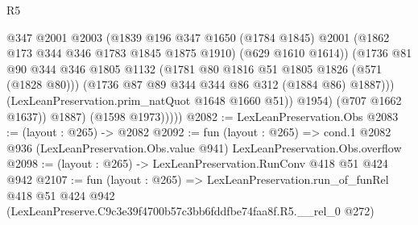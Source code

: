 \begin{lexlean}{R5}
\begin{coremodule}
                      @347
                      @2001
                      @2003
                      (@1839
                        @196
                        @347
                        @1650
                        (@1784 @1845)
                        @2001
                        (@1862 @173 @344 @346 @1783 @1845 @1875 @1910)
                        (@629 @1610 @1614))
                      (@1736
                        @81
                        @90
                        @344
                        @346
                        @1805
                        @1132
                        (@1781 @80 @1816 @51 @1805 @1826 (@571 (@1828 @80)))
                        (@1736 @87 @89 @344 @344 @86 @312 (@1884 @86) @1887)))
                    (LexLeanPreservation.prim_natQuot @1648 @1660 @51))
                  @1954)
                (@707 @1662 @1637))
              @1887)
            (@1598 @1973)))))
@2082 := LexLeanPreservation.Obs
@2083 := (layout : @265) -> @2082
@2092 := fun (layout : @265) =>
  cond.{1} @2082 @936 (LexLeanPreservation.Obs.value @941) LexLeanPreservation.Obs.overflow
@2098 := (layout : @265) -> LexLeanPreservation.RunConv @418 @51 @424 @942
@2107 := fun (layout : @265) =>
  LexLeanPreservation.run_of_funRel
    @418
    @51
    @424
    @942
    (LexLeanPreserve.C9c3e39f4700b57c3bb6fddfbe74faa8f.R5.__rel_0 @272)
\end{coremodule}
\end{lexlean}
